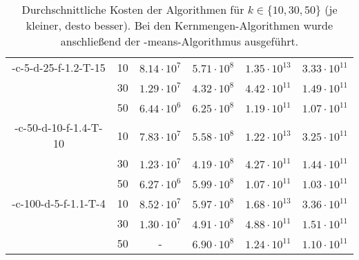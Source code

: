 \begin{table}[h]
\begin{tabular}{@{}cccccc@{}}
	\KCsTwo-c-5-d-25-f-1.2-T-15	& 10 & $8.14 \cdot 10^7$ & $5.71 \cdot 10^8$ & $1.35 \cdot 10^{13}$ & $3.33 \cdot 10^{11}$ \\
			 					& 30 & $1.29 \cdot 10^7$ & $4.32 \cdot 10^8$ & $4.42 \cdot 10^{11}$ & $1.49 \cdot 10^{11}$ \\
		 						& 50 & $6.44 \cdot 10^6$ & $6.25 \cdot 10^8$ & $1.19 \cdot 10^{11}$ & $1.07 \cdot 10^{11}$ \\
	\midrule
	\KCsTwo-c-50-d-10-f-1.4-T-10& 10 & $7.83 \cdot 10^7$ & $5.58 \cdot 10^8$ & $1.22 \cdot 10^{13}$ & $3.25 \cdot 10^{11}$ \\
			 					& 30 & $1.23 \cdot 10^7$ & $4.19 \cdot 10^8$ & $4.27 \cdot 10^{11}$ & $1.44 \cdot 10^{11}$ \\
		 						& 50 & $6.27 \cdot 10^6$ & $5.99 \cdot 10^8$ & $1.07 \cdot 10^{11}$ & $1.03 \cdot 10^{11}$ \\
	\midrule
	\KCsTwo-c-100-d-5-f-1.1-T-4	& 10 & $8.52 \cdot 10^7$ & $5.97 \cdot 10^8$ & $1.68 \cdot 10^{13}$ & $3.36 \cdot 10^{11}$ \\
			 					& 30 & $1.30 \cdot 10^7$ & $4.91 \cdot 10^8$ & $4.88 \cdot 10^{11}$ & $1.51 \cdot 10^{11}$ \\
		 						& 50 & - 				& $6.90 \cdot 10^8$ & $1.24 \cdot 10^{11}$ & $1.10 \cdot 10^{11}$ \\
	\bottomrule
\end{tabular}
\caption{Durchschnittliche Kosten der Algorithmen für $k \in \{ 10, 30, 50 \}$ (je kleiner, desto besser). Bei den Kernmengen-Algorithmen
wurde anschließend der \kmpp-means-Algorithmus ausgeführt.}
\label{tbl:experiment-coresets-kernel-costs-kmpp}
\end{table}
\newpage
